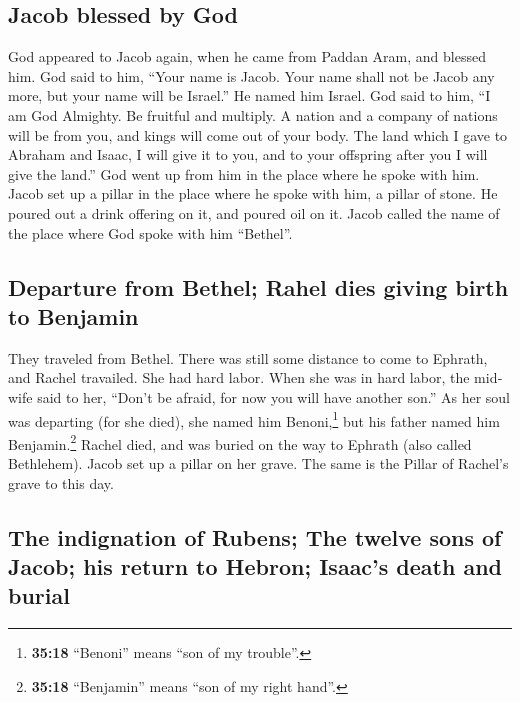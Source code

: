 \begin{paracol}{2}
\begin{otherlanguage}{english}
\hypertarget{jacob-blessed-by-god}{%
\subsection{Jacob blessed by God}\label{jacob-blessed-by-god}}

 God appeared to Jacob again, when he came from Paddan
Aram, and blessed him.  God said to him, ``Your name is
Jacob. Your name shall not be Jacob any more, but your name will be
Israel.'' He named him Israel.  God said to him, ``I am
God Almighty. Be fruitful and multiply. A nation and a company of
nations will be from you, and kings will come out of your body.
 The land which I gave to Abraham and Isaac, I will give
it to you, and to your offspring after you I will give the land.''
 God went up from him in the place where he spoke with
him.  Jacob set up a pillar in the place where he spoke
with him, a pillar of stone. He poured out a drink offering on it, and
poured oil on it.  Jacob called the name of the place
where God spoke with him ``Bethel''.

\hypertarget{departure-from-bethel-rahel-dies-giving-birth-to-benjamin}{%
\subsection{Departure from Bethel; Rahel dies giving birth to
Benjamin}\label{departure-from-bethel-rahel-dies-giving-birth-to-benjamin}}

 They traveled from Bethel. There was still some distance
to come to Ephrath, and Rachel travailed. She had hard labor.
 When she was in hard labor, the midwife said to her,
``Don't be afraid, for now you will have another son.'' 
As her soul was departing (for she died), she named him
Benoni,\footnote{\textbf{35:18} ``Benoni'' means ``son of my trouble''.}
but his father named him Benjamin.\footnote{\textbf{35:18} ``Benjamin''
  means ``son of my right hand''.}  Rachel died, and was
buried on the way to Ephrath (also called Bethlehem). 
Jacob set up a pillar on her grave. The same is the Pillar of Rachel's
grave to this day.

\hypertarget{the-indignation-of-rubens-the-twelve-sons-of-jacob-his-return-to-hebron-isaacs-death-and-burial}{%
\subsection{The indignation of Rubens; The twelve sons of Jacob; his
return to Hebron; Isaac's death and
burial}\label{the-indignation-of-rubens-the-twelve-sons-of-jacob-his-return-to-hebron-isaacs-death-and-burial}}


\end{otherlanguage}
\end{paracol}
